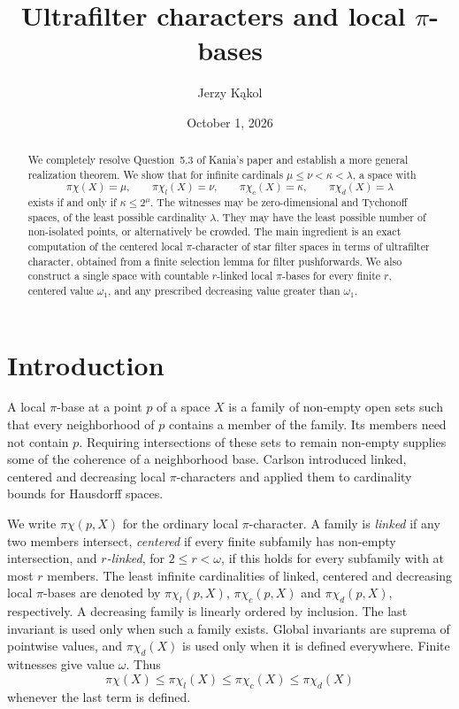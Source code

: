 \documentclass[11pt,a4paper]{amsart}
\title[Ultrafilter characters and local $\pi$-bases]{Ultrafilter characters and local $\pi$-bases}
\author{Jerzy K\k{a}kol}
\date{October 1, 2026}
\theoremstyle{definition}
\theoremstyle{remark}
\newcommand{\pc}{\pi\chi}
\newcommand{\pcl}{\pi\chi_l}
\newcommand{\pcc}{\pi\chi_c}
\newcommand{\pcd}{\pi\chi_d}
\begin{document}
\begin{abstract}
We completely resolve Question~5.3 of Kania's paper \cite{Kania} and establish a more general realization theorem. We show that for infinite cardinals $\mu\leqslant\nu<\kappa<\lambda$, a space with
\[
\pc(X)=\mu,\qquad\pcl(X)=\nu,\qquad
\pcc(X)=\kappa,\qquad\pcd(X)=\lambda
\]
exists if and only if $\kappa\leqslant2^\mu$. The witnesses may be zero-dimensional and Tychonoff spaces, of the least possible cardinality $\lambda$. They may have the least possible number of non-isolated points, or alternatively be crowded. The main ingredient is an exact computation of the centered local $\pi$-character of star filter spaces in terms of ultrafilter character, obtained from a finite selection lemma for filter pushforwards. We also construct a single space with countable $r$-linked local $\pi$-bases for every finite $r$, centered value $\omega_1$, and any prescribed decreasing value greater than $\omega_1$.




\end{abstract}
\maketitle

\section{Introduction}

A local $\pi$-base at a point $p$ of a space $X$ is a family of non-empty open sets such that every neighborhood of $p$ contains a member of the family. Its members need not contain $p$. Requiring intersections of these sets to remain non-empty supplies some of the coherence of a neighborhood base. Carlson \cite{Carlson} introduced linked, centered and decreasing local $\pi$-characters and applied them to cardinality bounds for Hausdorff spaces.

We write $\pc(p,X)$ for the ordinary local $\pi$-character. A family is \emph{linked} if any two members intersect, \emph{centered} if every finite subfamily has non-empty intersection, and \emph{$r$-linked}, for $2\leqslant r<\omega$, if this holds for every subfamily with at most $r$ members. The least infinite cardinalities of linked, centered and decreasing local $\pi$-bases are denoted by $\pcl(p,X)$, $\pcc(p,X)$ and $\pcd(p,X)$, respectively. A decreasing family is linearly ordered by inclusion. The last invariant is used only when such a family exists. Global invariants are suprema of pointwise values, and $\pcd(X)$ is used only when it is defined everywhere. Finite witnesses give value $\omega$. Thus
\[
\pc(X)\leqslant\pcl(X)\leqslant\pcc(X)\leqslant\pcd(X)
\]
whenever the last term is defined.
\end{document}
